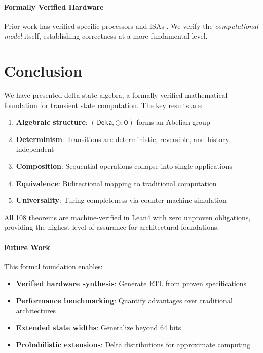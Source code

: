 \documentclass[11pt,letterpaper]{article}
\theoremstyle{plain}
\theoremstyle{definition}
\theoremstyle{remark}
\newcommand{\dcompose}{\oplus}           %
\newcommand{\dzero}{\mathbf{0}}          %
\newcommand{\DeltaType}{\mathsf{Delta}}
\begin{document}
\paragraph{Formally Verified Hardware}
Prior work has verified specific processors \cite{hunt1989fm8501} and ISAs \cite{reid2016trustworthy}. We verify the \emph{computational model} itself, establishing correctness at a more fundamental level.

\section{Conclusion}
\label{sec:conclusion}

We have presented delta-state algebra, a formally verified mathematical foundation for transient state computation. The key results are:

\begin{enumerate}
    \item \textbf{Algebraic structure}: $(\DeltaType, \dcompose, \dzero)$ forms an Abelian group
    \item \textbf{Determinism}: Transitions are deterministic, reversible, and history-independent
    \item \textbf{Composition}: Sequential operations collapse into single applications
    \item \textbf{Equivalence}: Bidirectional mapping to traditional computation
    \item \textbf{Universality}: Turing completeness via counter machine simulation
\end{enumerate}

All 108 theorems are machine-verified in Lean4 with zero unproven obligations, providing the highest level of assurance for architectural foundations.

\paragraph{Future Work}
This formal foundation enables:
\begin{itemize}
    \item \textbf{Verified hardware synthesis}: Generate RTL from proven specifications
    \item \textbf{Performance benchmarking}: Quantify advantages over traditional architectures
    \item \textbf{Extended state widths}: Generalize beyond 64 bits
    \item \textbf{Probabilistic extensions}: Delta distributions for approximate computing
\end{itemize}
\end{document}
